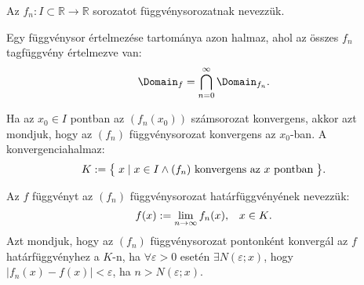 \documentclass[a4paper, 12pt]{scrartcl}
\begin{document}
\begin{definition}[Függvénysorozat]
  Az $f_n : I \subset \mathbb R \to \mathbb R$ sorozatot függvénysorozatnak
  nevezzük.
\end{definition}

\begin{note}
  Egy függvénysor értelmezése tartománya azon halmaz, ahol az összes $f_n$
  tagfüggvény értelmezve van:
  $$
    \Domain_f = \bigcap_{n=0}^\infty \Domain_{f_n}
    \text.
  $$
\end{note}



\begin{definition}
  Ha az $x_0 \in I$ pontban az $(f_n(x_0))$ számsorozat konvergens, akkor azt
  mondjuk, hogy az $(f_n)$ függvénysorozat konvergens az $x_0$-ban. A
  konvergenciahalmaz:
  $$
    K := \big\{\;
    x \mid x \in I \land (f_n) \text{ konvergens az } x \text{ pontban}
    \;\big\}
    \text.
  $$
\end{definition}



\begin{definition}
  Az $f$ függvényt az $(f_n)$ függvénysorozat határfüggvényének nevezzük:
  $$
    f(x) := \lim_{n \to \infty} f_n(x)
    \text,\quad
    x \in K
    \text.
  $$
  Azt mondjuk, hogy az $(f_n)$ függvénysorozat pontonként konvergál az $f$
  határfüggvényhez a $K$-n, ha $\forall \varepsilon > 0$ esetén
  $\exists N(\varepsilon; x)$, hogy $|f_n(x) - f(x)| < \varepsilon$, ha
  $n > N(\varepsilon; x)$.
\end{definition}
\end{document}
